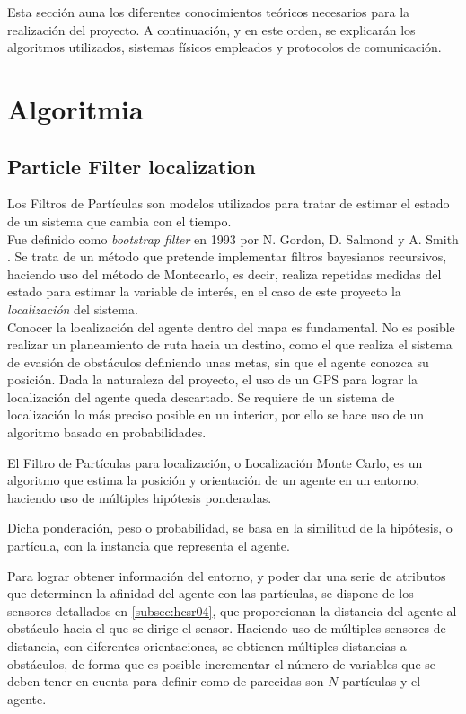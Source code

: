 

Esta sección auna los diferentes conocimientos teóricos necesarios para la realización del proyecto. A continuación, y en este orden, se explicarán los algoritmos utilizados, sistemas físicos empleados y  protocolos de comunicación.

\section{Algoritmia}


\subsection{Particle Filter localization}

Los Filtros de Partículas son modelos utilizados para tratar de estimar el estado de un sistema que cambia con el tiempo. 
\\Fue definido como \textit{bootstrap filter} en 1993 por N. Gordon, D. Salmond y A. Smith \citep{art:GSSPF}.  Se trata de un método que pretende implementar filtros bayesianos recursivos, haciendo uso del método de Montecarlo, es decir, realiza repetidas medidas del estado para estimar la variable de interés, en el caso de este proyecto la \emph{localización} del sistema.
\\


Conocer la localización del agente dentro del mapa es fundamental. No es posible realizar un planeamiento de ruta hacia un destino, como el que realiza el sistema de evasión de obstáculos definiendo unas metas, sin que el agente conozca su posición.
Dada la naturaleza del proyecto, el uso de un GPS para lograr la localización del agente queda descartado. Se requiere de un sistema de localización lo más preciso posible en un interior, por ello se hace uso de un algoritmo basado en probabilidades. 

El Filtro de Partículas para localización, o Localización Monte Carlo, es un algoritmo que estima la posición y orientación de un agente en un entorno, haciendo uso de múltiples hipótesis ponderadas. 

Dicha ponderación, peso o probabilidad, se basa en la similitud de la hipótesis, o partícula, con la instancia que representa el agente. 

Para lograr obtener información del entorno, y poder dar una serie de atributos que determinen la afinidad del agente con las partículas, se dispone de los sensores detallados en \ref{subsec:hcsr04}, que proporcionan la distancia del agente al obstáculo hacia el que se dirige el sensor. 
Haciendo uso de múltiples sensores de distancia, con diferentes orientaciones, se obtienen múltiples distancias a obstáculos, de forma que es posible incrementar el número de variables que se deben tener en cuenta para definir como de parecidas son $N$ partículas y el agente.  


